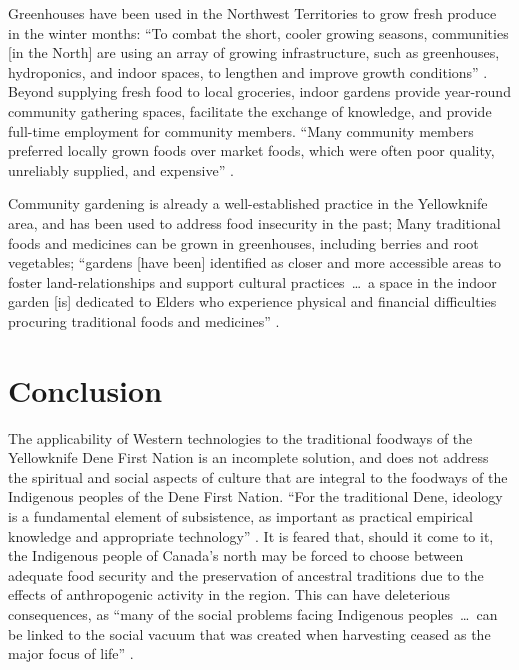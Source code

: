 \documentclass{report}
\begin{document}
\hspace{24pt} Greenhouses have been used in the Northwest Territories to grow fresh produce in the winter months: ``To combat the short, cooler growing seasons, communities [in the North] are using an array of growing infrastructure, such as greenhouses, hydroponics, and indoor spaces, to lengthen and improve growth conditions'' \parencite[90]{resilientcommunities}. Beyond supplying fresh food to local groceries, indoor gardens provide year-round community gathering spaces, facilitate the exchange of knowledge, and provide full-time employment for community members. ``Many community members preferred locally grown foods over market foods, which were often poor quality, unreliably supplied, and expensive'' \parencite[99]{resilientcommunities}.

\hspace{24pt} Community gardening is already a well-established practice in the Yellowknife area, and has been used to address food insecurity in the past; Many traditional foods and medicines can be grown in greenhouses, including berries and root vegetables; ``gardens [have been] identified as closer and more accessible areas to foster land-relationships and support cultural practices~\ldots~a space in the indoor garden [is] dedicated to Elders who experience physical and financial difficulties procuring traditional foods and medicines'' \parencite[99]{resilientcommunities}.

\clearpage

\section{Conclusion}

\hspace{24pt} The applicability of Western technologies to the traditional foodways of the Yellowknife Dene First Nation is an incomplete solution, and does not address the spiritual and social aspects of culture that are integral to the foodways of the Indigenous peoples of the Dene First Nation.
``For the traditional Dene, ideology is a fundamental element of subsistence, as important as practical empirical knowledge and appropriate technology'' \parencite[64]{lorecapturingtraditional}.
It is feared that, should it come to it, the Indigenous people of Canada's north may be forced to choose between adequate food security and the preservation of ancestral traditions due to the effects of anthropogenic activity in the region. 
This can have deleterious consequences, as ``many of the social problems facing Indigenous peoples~\ldots~can be linked to the social vacuum that was created when harvesting ceased as the major focus of life'' \parencite[269]{socialculturalcapital}.
\end{document}

